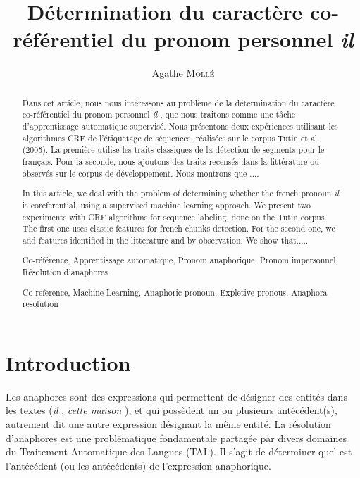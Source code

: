 \documentclass[a4paper,12pt]{article}
\title{Détermination du caractère co-référentiel du pronom personnel \og{}\textit{il}\fg{}}
\author{Agathe \textsc{Mollé}}
\begin{document}
\maketitle

\begin{abstract}
Dans cet article, nous nous intéressons au problème de la détermination du caractère co-référentiel du pronom personnel \og \textit{il} \fg{}, que nous traitons comme une tâche d'apprentissage automatique supervisé. Nous présentons deux expériences utilisant les algorithmes CRF de l'étiquetage de séquences, réalisées sur le corpus Tutin et al. (2005). La première utilise les traits classiques de la détection de segments pour le français. Pour la seconde, nous ajoutons des traits recensés dans la littérature ou observés sur le corpus de développement. Nous montrons que ....
\end{abstract}

\renewcommand\abstractname{Abstract}
\begin{abstract}
In this article, we deal with the problem of determining whether the french pronoun \og \textit{il} \fg{} is coreferential, using a supervised machine learning approach. We present two experiments with CRF algorithms for sequence labeling, done on the Tutin corpus. The first one uses classic features for french chunks detection. For the second one, we add features identified in the litterature and by observation. We show that.....
\end{abstract}


\paragraph{}

\renewcommand\abstractname{Mots-clés}
\begin{abstract}
Co-référence, Apprentissage automatique, Pronom anaphorique, Pronom impersonnel, Résolution d'anaphores
\end{abstract}

\renewcommand\abstractname{Keywords}
\begin{abstract}
Co-reference, Machine Learning, Anaphoric pronoun, Expletive pronous, Anaphora resolution
\end{abstract}

\section*{Introduction}

Les anaphores sont des expressions qui permettent de désigner des entités dans les textes (\og \textit{il} \fg{}, \og \textit{cette maison} \fg{}), et qui possèdent un ou plusieurs antécédent(s), autrement dit une autre expression désignant la même entité. La résolution  d'anaphores est une problématique fondamentale partagée par divers domaines du Traitement Automatique des Langues (TAL). Il s'agit de déterminer quel est l'antécédent (ou les antécédents) de l'expression anaphorique.
\end{document}
